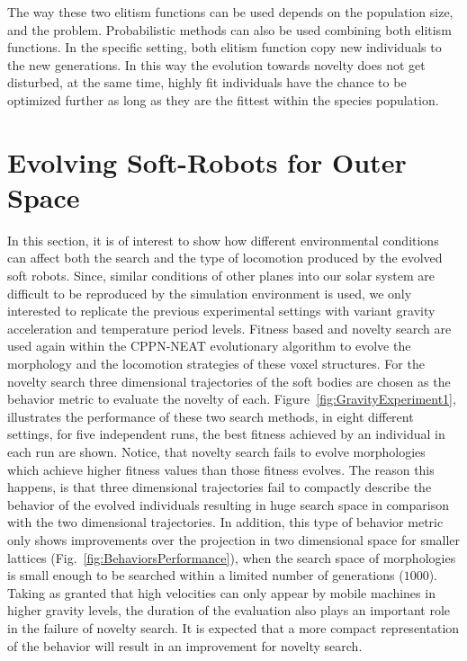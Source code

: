The way these two elitism functions can be used depends on the population size, and the problem. Probabilistic methods can also be used combining both elitism functions. In the specific setting, both elitism function copy new individuals to the new generations. In this way the evolution towards novelty does not get disturbed, at the same time, highly fit individuals have the chance to be optimized further as long as they are the fittest within the species population.



\section{Evolving Soft-Robots for Outer Space}  
In this section, it is of interest to show how different environmental conditions can affect both the search and the type of locomotion produced by the evolved soft robots. Since, similar conditions of other planes into our solar system are difficult to be reproduced by the simulation environment is used, we only interested to replicate the previous experimental settings with variant gravity acceleration and temperature period levels. Fitness based and novelty search are used again within the CPPN-NEAT evolutionary algorithm to evolve the morphology and the locomotion strategies of these voxel structures. For the novelty search three dimensional trajectories of the soft bodies are chosen as the behavior metric to evaluate the novelty of each. Figure~\ref{fig:GravityExperiment1}, illustrates the performance of these two search methods, in eight different settings, for five independent runs, the best fitness achieved by an individual in each run are shown. Notice, that novelty search fails to evolve morphologies which achieve higher fitness values than those fitness evolves. The reason this happens, is that three dimensional trajectories fail to compactly describe the behavior of the evolved individuals resulting in huge search space in comparison with the two dimensional trajectories. In addition, this type of behavior metric only shows improvements over the projection in two dimensional space for smaller lattices (Fig.~\ref{fig:BehaviorsPerformance}), when the search space of morphologies is small enough to be searched within a limited number of generations ($1000$). Taking as granted that high velocities can only appear by mobile machines in higher gravity levels, the duration of the evaluation also plays an important role in the failure of novelty search. It is expected that a more compact representation of the behavior will result in an improvement for novelty search.



